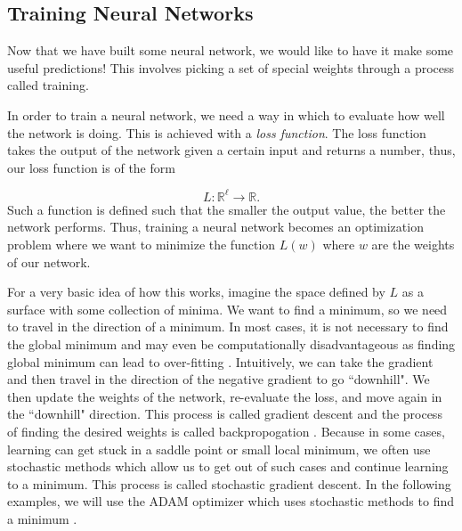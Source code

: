 \documentclass{CUP-JNL-DTM}%
\theoremstyle{definition}
\numberwithin{equation}{section}
\begin{document}

\subsection{Training Neural Networks}

Now that we have built some neural network, we would like to have it make some useful predictions! This involves picking a set of special weights through a process called training. 

In order to train a neural network, we need a way in which to evaluate how well the network is doing. This is achieved with a \emph{loss function}. The loss function takes the output of the network given a certain input and returns a number, thus, our loss function is of the form

\begin{equation}
    L : \mathbb{R}^{\ell} \rightarrow \mathbb{R}. 
\end{equation}
Such a function is defined such that the smaller the output value, the better the network performs. Thus, training a neural network becomes an optimization problem where we want to minimize the function $L(w)$ where $w$ are the weights of our network. 

For a very basic idea of how this works, imagine the space defined by $L$ as a surface with some collection of minima. We want to find a minimum, so we need to travel in the direction of a minimum. In most cases, it is not necessary to find the global minimum and may even be computationally disadvantageous as finding global minimum can lead to over-fitting \cite{choromanskaLossSurfacesMultilayer2015}. Intuitively, we can take the gradient and then travel in the direction of the negative gradient to go ``downhill". We then update the weights of the network, re-evaluate the loss, and move again in the ``downhill" direction. This process is called gradient descent and the process of finding the desired weights is called backpropogation \cite{chauvinBackpropagationTheoryArchitectures1995}. Because in some cases, learning can get stuck in a saddle point or small local minimum, we often use stochastic methods which allow us to get out of such cases and continue learning to a minimum. This process is called stochastic gradient descent. In the following examples, we will use the ADAM optimizer which uses stochastic methods to find a minimum \cite{kingmaAdamMethodStochastic2017}. 
\end{document}
